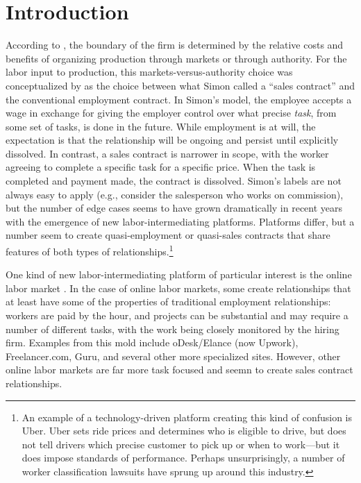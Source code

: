 \documentclass[11pt]{article}
\begin{document}
\doublespacing

\section{Introduction}
According to \cite{coase1937nature}, the boundary of the firm is determined by the relative costs and benefits of organizing production through markets or through authority. 
For the labor input to production, this markets-versus-authority choice was conceptualized by \cite{simon1951formal} as the choice between what Simon called a ``sales contract'' and the conventional employment contract.
In Simon's model, the employee accepts a wage in exchange for giving the employer control over what precise \emph{task}, from some set of tasks, is done in the future.
While employment is at will, the expectation is that the relationship will be ongoing and persist until explicitly dissolved. 
In contrast, a sales contract is narrower in scope, with the worker agreeing to complete a specific task for a specific price.
When the task is completed and payment made, the contract is dissolved. 
Simon's labels are not always easy to apply (e.g., consider the salesperson who works on commission), but the number of edge cases seems to have grown dramatically in recent years with the emergence of new labor-intermediating platforms. 
Platforms differ, but a number seem to create quasi-employment or quasi-sales contracts that share features of both types of relationships.\footnote{
An example of a technology-driven platform creating this kind of confusion is Uber.  
Uber sets ride prices and determines who is eligible to drive, but does not tell drivers which precise customer to pick up or when to work---but it does impose standards of performance.
Perhaps unsurprisingly, a number of worker classification lawsuits have sprung up around this industry.
}

One kind of new labor-intermediating platform of particular interest is the online labor market \citep{horton2010online}. 
In the case of online labor markets, some create relationships that at least have some of the properties of traditional employment relationships:
workers are paid by the hour, and projects can be substantial and may require a number of different tasks, with the work being closely monitored by the hiring firm.
Examples from this mold include oDesk/Elance (now Upwork), Freelancer.com, Guru, and several other more specialized sites. 
However, other online labor markets are far more task focused and seemn to create sales contract relationships.
\end{document}
